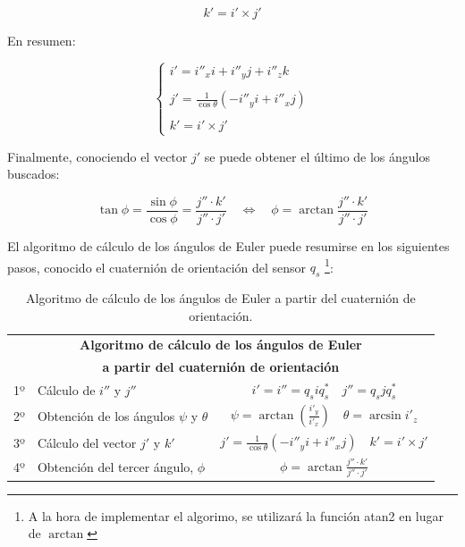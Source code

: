 \documentclass[12pt, a4paper]{report}
\begin{document}
$$ k' = i' \times j' $$

En resumen:

\begin{equation}
\begin{cases}
i' = i''_x i + i''_y j + i''_z k \\
\\
j' = \displaystyle\frac{1}{\cos\theta} \left( - i''_y i + i''_x j \right) \\
\\
k' = i' \times j'
\end{cases}
\end{equation}

Finalmente, conociendo el vector $j'$ se puede obtener el último de los ángulos buscados:

\begin{equation}
\tan\phi = \frac{\sin \phi}{\cos \phi} = \frac{j'' \cdot k'}{j'' \cdot j'} \quad \iff \quad \phi = \arctan \frac{j'' \cdot k'}{j'' \cdot j'}
\end{equation}

El algoritmo de cálculo de los ángulos de Euler puede resumirse en los siguientes pasos, conocido el cuaternión de orientación del sensor $q_s$ \footnote{A la hora de implementar el algorimo, se utilizará la función atan2 en lugar de $\arctan$}:

\begin{table}[h]
	\center
	\begin{tabular}{|l|l|c|}
	\hline
	\multicolumn{3}{|c|}{\textbf{Algoritmo de cálculo de los ángulos de Euler}}\\
	\multicolumn{3}{|c|}{\textbf{a partir del cuaternión de orientación}}\\
	\hline
	1º & Cálculo de $i''$ y $j''$ & $ i' = i'' = q_siq_s^* \quad j'' = q_sjq_s^*$  \\
	2º & Obtención de los ángulos $\psi$ y $\theta$ & $ \psi = \arctan \left( \displaystyle\frac{i'_y}{i'_x} \right) \quad \theta = \arcsin i'_z $ \\
	3º & Cálculo del vector $j'$ y $k'$ & $ j' = \displaystyle\frac{1}{\cos\theta} \left( - i''_y i + i''_x j \right) \quad k' = i' \times j' $ \\
	4º & Obtención del tercer ángulo, $\phi$ & $ \phi = \arctan \displaystyle\frac{j'' \cdot k'}{j'' \cdot j'} $ \\
	\hline
	\end{tabular}

	\caption{Algoritmo de cálculo de los ángulos de Euler a partir del cuaternión de orientación.}
	\label{tab:algoritmo_angulos_euler}

\end{table}
\end{document}

